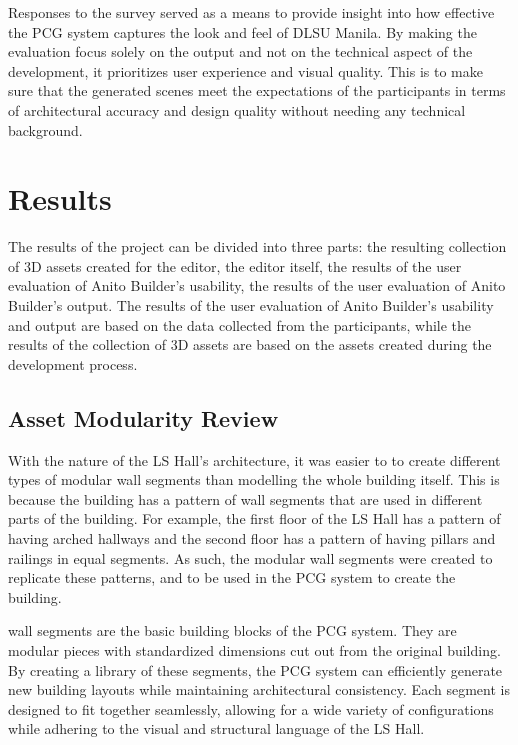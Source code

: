 \documentclass[manuscript,screen,12pt]{article}
\begin{document}
Responses to the survey served as a means to provide insight into how effective the PCG system captures the look and feel of DLSU Manila. By making the evaluation focus solely on the output and not on the technical aspect of the development, it prioritizes user experience and visual quality. This is to make sure that the generated scenes meet the expectations of the participants in terms of architectural accuracy and design quality without needing any technical background. 

\newpage
\section{Results}

The results of the project can be divided into three parts: the resulting collection of 3D assets created for the editor, the editor itself, the results of the user evaluation of Anito Builder's usability, the results of the user evaluation of Anito Builder's output. The results of the user evaluation of Anito Builder's usability and output are based on the data collected from the participants, while the results of the collection of 3D assets are based on the assets created during the development process.

\subsection{Asset Modularity Review}

With the nature of the LS Hall's architecture, it was easier to to create different types of modular wall segments than modelling the whole building itself. This is because the building has a pattern of wall segments that are used in different parts of the building. For example, the first floor of the LS Hall has a pattern of having arched hallways and the second floor has a pattern of having pillars and railings in equal segments. As such, the modular wall segments were created to replicate these patterns, and to be used in the PCG system to create the building.

wall segments are the basic building blocks of the PCG system. They are modular pieces with standardized dimensions cut out from the original building. By creating a library of these segments, the PCG system can efficiently generate new building layouts while maintaining architectural consistency. Each segment is designed to fit together seamlessly, allowing for a wide variety of configurations while adhering to the visual and structural language of the LS Hall.
\end{document}
